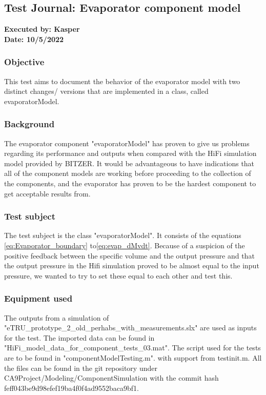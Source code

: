 \subsection{Test Journal: Evaporator component model} \label{app:tj_1}

\textbf{Executed by: Kasper} \\
\textbf{Date: 10/5/2022}

\subsubsection*{Objective}
This test aims to document the behavior of the evaporator model with two distinct changes/ versions that are implemented in a class, called evaporatorModel.

\subsubsection*{Background}
The evaporator component "evaporatorModel" has proven to give us problems regarding its performance and outputs when compared with the HiFi simulation model provided by BITZER.
It would be advantageous to have indications that all of the component models are working before proceeding to the collection of the components, and the evaporator has proven to be the hardest component to get acceptable results from.

\subsubsection*{Test subject}
The test subject is the class "evaporatorModel". It consists of the equations \cref{eq:Evaporator_boundary} to\cref{eq:evap_dMvdt}.
Because of a suspicion of the positive feedback between the specific volume and the output pressure and that the output pressure in the Hifi simulation proved to be almost equal to the input pressure, we wanted to try to set these equal to each other and test this.

\subsubsection*{Equipment used}
The outputs from a simulation of "eTRU\_prototype\_2\_old\_perhabs\_with\_measurements.slx" are used as inputs for the test. The imported data can be found in "HiFi\_model\_data\_for\_component\_tests\_03.mat".
The script used for the tests are to be found in "componentModelTesting.m". with support from testinit.m.
All the files can be found in the git repository under CA9Project/Modeling/ComponentSimulation with the commit hash feff043be9d98efef19ba4f0f4ad9552baca9bf1.

